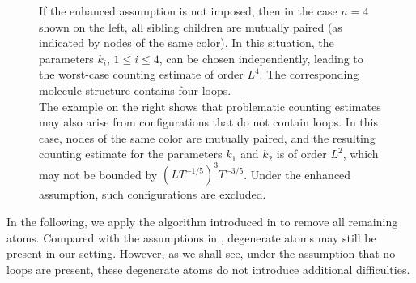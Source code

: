 \documentclass[UTF-8,reqno]{amsart}
\numberwithin{equation}{section}
\theoremstyle{definition}
\def\leq{\leqslant}
\def\leq{\leqslant}
\begin{document}
\begin{figure}
\caption{If the enhanced assumption is not imposed, then in the case $n = 4$ shown on the left, 
all sibling children are mutually paired (as indicated by nodes of the same color). 
In this situation, the parameters $k_i$, $1 \leq i \leq 4$, can be chosen independently, 
leading to the worst-case counting estimate of order $L^{4}$. 
The corresponding molecule structure contains four loops.\\
The example on the right shows that problematic counting estimates may also arise 
from configurations that do not contain loops. 
In this case, nodes of the same color are mutually paired, 
and the resulting counting estimate for the parameters $k_1$ and $k_2$ is of order $L^{2}$, 
which may  not be bounded by $(LT^{-1/5})^3 T^{-3/5}$. 
Under the enhanced assumption, such configurations are excluded. }
\label{fig:1loop}
\end{figure}

 In the following, we apply the algorithm introduced in \cite[Section 7]{Vas24} 
to remove all remaining atoms. 
Compared with the assumptions in \cite[Section 7.1]{Vas24}, 
degenerate atoms may still be present in our setting. 
However, as we shall see, under the assumption that no loops are present, 
these degenerate atoms do not introduce additional difficulties.
\end{document}
